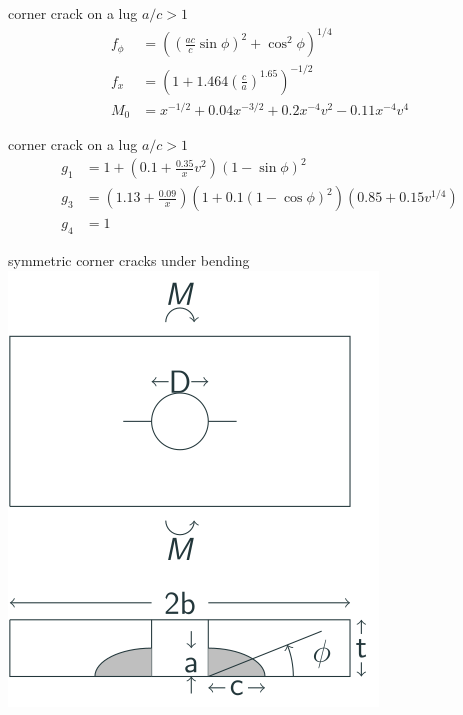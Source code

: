 \documentclass[
  letterpaper,
  ignorenonframetext,
  aspectratio=43,
  handout,
  12pt]{beamer}
\let\Oldincludegraphics\includegraphics
\renewcommand{\includegraphics}[2][]{\Oldincludegraphics[width=\textwidth,height=0.7\textheight,keepaspectratio]{#2}}
\begin{document}
\begin{frame}{corner crack on a lug \(a/c > 1\)}
\protect\hypertarget{corner-crack-on-a-lug-ac-1}{}
\[\begin{aligned}
  f_\phi &= \left(\left(\frac{ac}{c} \sin \phi \right)^2 + \cos^2 \phi \right)^{1/4}\\
  f_x &= \left(1 + 1.464 \left(\frac{c}{a}\right)^{1.65}\right)^{-1/2}\\
  M_0 &= x^{-1/2} + 0.04 x^{-3/2} + 0.2 x^{-4} v^2  - 0.11 x^{-4}v^4
\end{aligned}\]
\end{frame}

\begin{frame}{corner crack on a lug \(a/c > 1\)}
\protect\hypertarget{corner-crack-on-a-lug-ac-1-1}{}
\[\begin{aligned}
  g_1 &= 1 + \left(0.1 + \frac{0.35}{x}v^2\right)\left(1-\sin \phi \right)^2\\
  g_3 &= \left(1.13 + \frac{0.09}{x}\right)\left(1+0.1(1-\cos \phi)^2\right)\left(0.85 + 0.15v^{1/4}\right)\\
  g_4 &= 1
\end{aligned}\]
\end{frame}

\begin{frame}{symmetric corner cracks under bending}
\protect\hypertarget{symmetric-corner-cracks-under-bending}{}
\includegraphics{../images/bearing-symmetric-corner.svg}
\end{frame}
\end{document}
